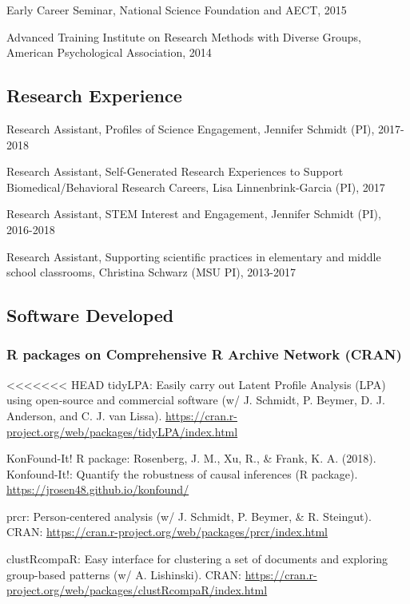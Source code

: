 \documentclass[14,]{article}
\begin{document}
Early Career Seminar, National Science Foundation and AECT, 2015

Advanced Training Institute on Research Methods with Diverse Groups,
American Psychological Association, 2014

\subsection{Research Experience}\label{research-experience}

Research Assistant, Profiles of Science Engagement, Jennifer Schmidt
(PI), 2017-2018

Research Assistant, Self-Generated Research Experiences to Support
Biomedical/Behavioral Research Careers, Lisa Linnenbrink-Garcia (PI),
2017

Research Assistant, STEM Interest and Engagement, Jennifer Schmidt (PI),
2016-2018

Research Assistant, Supporting scientific practices in elementary and
middle school classrooms, Christina Schwarz (MSU PI), 2013-2017

\subsection{Software Developed}\label{software-developed}

\subsubsection{R packages on Comprehensive R Archive Network
(CRAN)}\label{r-packages-on-comprehensive-r-archive-network-cran}

\textless{}\textless{}\textless{}\textless{}\textless{}\textless{}\textless{}
HEAD tidyLPA: Easily carry out Latent Profile Analysis (LPA) using
open-source and commercial software (w/ J. Schmidt, P. Beymer, D. J.
Anderson, and C. J. van Lissa).
\url{https://cran.r-project.org/web/packages/tidyLPA/index.html}

KonFound-It! R package: Rosenberg, J. M., Xu, R., \& Frank, K. A.
(2018). Konfound-It!: Quantify the robustness of causal inferences (R
package). \url{https://jrosen48.github.io/konfound/}

prcr: Person-centered analysis (w/ J. Schmidt, P. Beymer, \& R.
Steingut). CRAN:
\url{https://cran.r-project.org/web/packages/prcr/index.html}

clustRcompaR: Easy interface for clustering a set of documents and
exploring group-based patterns (w/ A. Lishinski). CRAN:
\url{https://cran.r-project.org/web/packages/clustRcompaR/index.html}
\end{document}
